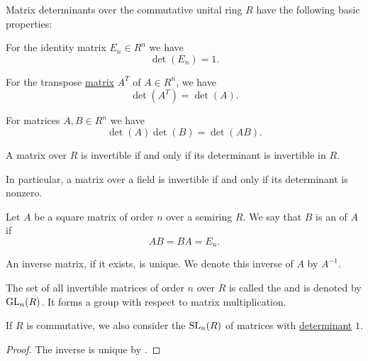 \begin{proposition}\label{thm:def:matrix_determinant}
  Matrix determinants over the commutative unital ring \( R \) have the following basic properties:
  \begin{thmenum}
     For the identity matrix \( E_n \in R^n \) we have
    \begin{equation*}
      \det(E_n) = 1.
    \end{equation*}

     For the transpose \hyperref[def:matrix_transpose]{matrix} \( A^T \) of \( A \in R^n \), we have
    \begin{equation*}
      \det(A^T) = \det(A).
    \end{equation*}

     For matrices \( A, B \in R^n \) we have
    \begin{equation*}
      \det(A) \det(B) = \det(AB).
    \end{equation*}
  \end{thmenum}
\end{proposition}

\begin{proposition}\label{thm:matrix_invertible_iff_nonsingular}
  A matrix over \( R \) is invertible if and only if its determinant is invertible in \( R \).

  In particular, a matrix over a field is invertible if and only if its determinant is nonzero.
\end{proposition}

\begin{definition}\label{def:inverse_matrix}
  Let \( A \) be a square matrix of order \( n \) over a semiring \( R \). We say that \( B \) is an  of \( A \) if
  \begin{equation*}
    AB = BA = E_n.
  \end{equation*}

  An inverse matrix, if it exists, is unique. We denote this inverse of \( A \) by \( A^{-1} \).

  The set of all invertible matrices of order \( n \) over \( R \) is called the  and is denoted by \( \operatorname{GL}_n(R) \). It forms a group with respect to matrix multiplication.

  If \( R \) is commutative, we also consider the  \( \operatorname{SL}_n(R) \) of matrices with \hyperref[def:matrix_determinant]{determinant} \( 1 \).
\end{definition}
\begin{proof}
  The inverse is unique by .
\end{proof}

